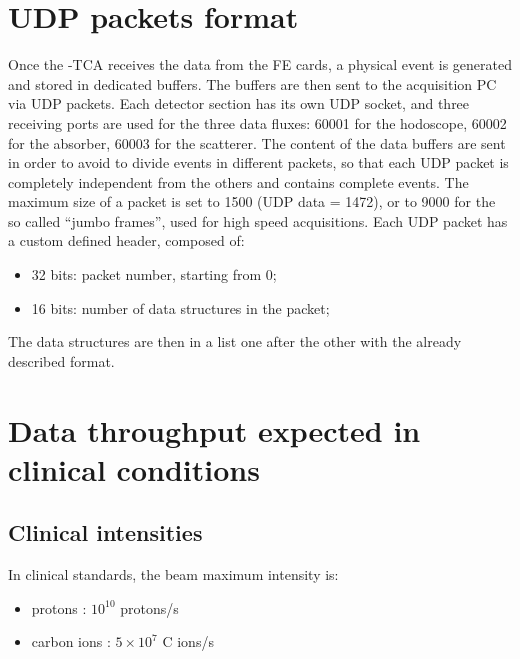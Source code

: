\section{UDP packets format}

Once the \charmu-TCA receives the data from the FE cards, a physical event is generated and stored in dedicated buffers. The buffers are then sent to the acquisition PC via UDP packets. Each detector section has its own UDP socket, and three receiving ports are used for the three data fluxes: 60001 for the hodoscope, 60002 for the absorber, 60003 for the scatterer. The content of the data buffers are sent in order to avoid to divide events in different packets, so that each UDP packet is completely independent from the others and contains complete events. The maximum size of a packet is set to 1500 (UDP data = 1472), or to 9000 for the so called \enquote{jumbo frames}, used for high speed acquisitions.\newline
Each UDP packet has a custom defined header, composed of:
\begin{itemize}
\item 32 bits: packet number, starting from 0;
\item 16 bits: number of data structures in the packet;
\end{itemize}
The data structures are then in a list one after the other with the already described format.

\section{Data throughput expected in clinical conditions}

\subsection{Clinical intensities}

In clinical standards, the beam maximum intensity is:
\begin{itemize}
	\item protons : $10^{10}$ protons/s
	\item carbon ions : $5\times10^7$ C ions/s\newline
\end {itemize}

